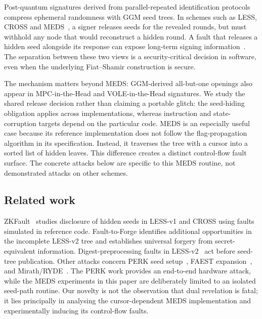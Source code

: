 Post-quantum signatures derived from parallel-repeated identification
protocols compress ephemeral randomness with GGM seed trees. In schemes such
as LESS, CROSS and MEDS~\cite{LESS-spec,CROSSspec,ChouNPRRST23}, a signer
releases seeds for the revealed rounds, but must withhold any node that would
reconstruct a hidden round. A fault that releases a hidden seed alongside its
response can expose long-term signing information~\cite{ZKFault,FaultToForge2025}.
The separation between these two views is a security-critical decision in
software, even when the underlying Fiat--Shamir construction is secure.

The mechanism matters beyond MEDS: GGM-derived all-but-one openings also
appear in MPC-in-the-Head and VOLE-in-the-Head signatures. We study the
shared release decision rather than claiming a portable glitch: the
seed-hiding obligation applies across implementations, whereas instruction
and state-corruption targets depend on the particular code. MEDS is an
especially useful case because its reference implementation does not follow
the flag-propagation algorithm in its specification. Instead, it traverses
the tree with a cursor into a sorted list of hidden leaves. This difference
creates a distinct control-flow fault surface. The concrete attacks below
are specific to this MEDS routine, not demonstrated attacks on other schemes.

\subsection{Related work}
\label{sec:relwork}
ZKFault~\cite{ZKFault} studies disclosure of hidden seeds in LESS-v1 and
CROSS using faults simulated in reference code. Fault-to-Forge
\cite{FaultToForge2025} identifies additional opportunities in the incomplete
LESS-v2 tree and establishes universal forgery from secret-equivalent
information. Digest-preprocessing faults in LESS-v2~\cite{HuangHHYSTY26}
act before seed-tree publication. Other attacks concern PERK seed
setup~\cite{cryptoeprint:2026/1266}, FAEST expansion~\cite{JendralD25},
and Mirath/RYDE~\cite{BandaBK26}. The PERK work provides an end-to-end
hardware attack, while the MEDS experiments in this paper are deliberately
limited to an isolated seed-path routine. Our novelty is not the observation
that dual revelation is fatal; it lies principally in analysing the
cursor-dependent MEDS implementation and experimentally inducing its
control-flow faults.

